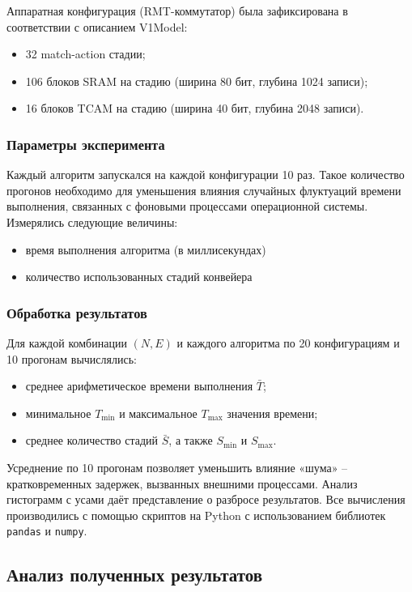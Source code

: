 Аппаратная конфигурация (RMT-коммутатор) была зафиксирована в соответствии с описанием V1Model: 
\begin{itemize}
	\item 32 match-action стадии;
	\item 106 блоков SRAM на стадию (ширина 80 бит, глубина 1024 записи);
	\item 16 блоков TCAM на стадию (ширина 40 бит, глубина 2048 записи).
\end{itemize}

\subsubsection{Параметры эксперимента}

Каждый алгоритм запускался на каждой конфигурации 10 раз. Такое количество прогонов необходимо для уменьшения влияния случайных флуктуаций времени выполнения, связанных с фоновыми процессами операционной системы. Измерялись следующие величины:
\begin{itemize}
	\item время выполнения алгоритма (в миллисекундах)
	\item количество использованных стадий конвейера 
\end{itemize}

\subsubsection{Обработка результатов}

Для каждой комбинации $(N, E)$ и каждого алгоритма по 20 конфигурациям и 10 прогонам вычислялись:
\begin{itemize}
	\item среднее арифметическое времени выполнения $\bar{T}$;
	\item минимальное $T_{\min}$ и максимальное $T_{\max}$ значения времени;
	\item среднее количество стадий $\bar{S}$, а также $S_{\min}$ и $S_{\max}$.
\end{itemize}

Усреднение по 10 прогонам позволяет уменьшить влияние «шума» – кратковременных задержек, вызванных внешними процессами. Анализ гистограмм с усами даёт представление о разбросе результатов. Все вычисления производились с помощью скриптов на Python с использованием библиотек \texttt{pandas} и \texttt{numpy}.

\subsection{Анализ полученных результатов}

